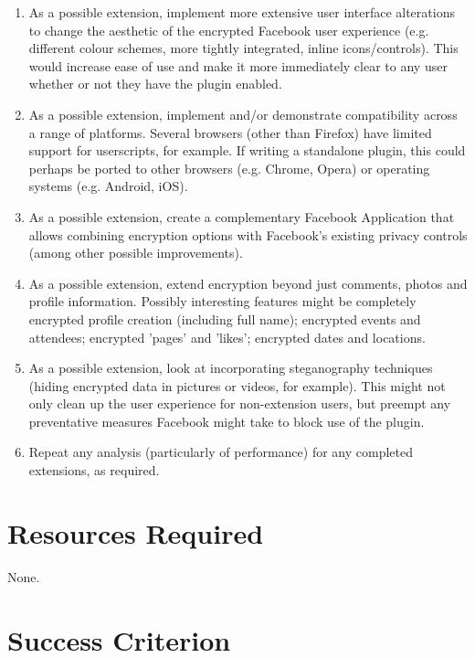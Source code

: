 \begin{enumerate}
\item As a possible extension, implement more extensive user interface alterations to change the aesthetic of the encrypted Facebook user experience (e.g. different colour schemes, more tightly integrated, inline icons/controls). This would increase ease of use and make it more immediately clear to any user whether or not they have the plugin enabled.

\item As a possible extension, implement and/or demonstrate compatibility across a range of platforms. Several browsers (other than Firefox) have limited support for userscripts, for example. If writing a standalone plugin, this could perhaps be ported to other browsers (e.g. Chrome, Opera) or operating systems (e.g. Android, iOS).

\item As a possible extension, create a complementary Facebook Application that allows combining encryption options with Facebook's existing privacy controls (among other possible improvements).

\item As a possible extension, extend encryption beyond just comments, photos and profile information. Possibly interesting features might be completely encrypted profile creation (including full name); encrypted events and attendees; encrypted 'pages' and 'likes'; encrypted dates and locations.

\item As a possible extension, look at incorporating steganography techniques (hiding encrypted data in pictures or videos, for example). This might not only clean up the user experience for non-extension users, but preempt any preventative measures Facebook might take to block use of the plugin.

\item Repeat any analysis (particularly of performance) for any completed extensions, as required.


\end{enumerate}


\section*{Resources Required}

None.


\section*{Success Criterion}

